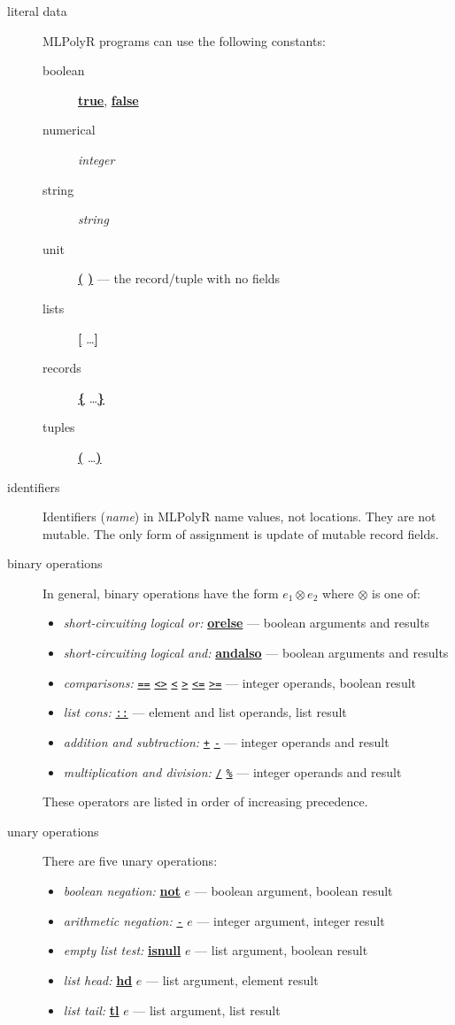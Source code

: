 \documentclass{article}
\newcommand{\nt}[1]{{\it #1}}
\newcommand{\tl}[1]{{\underline{\bf #1}}}
\newcommand{\ttl}[1]{{\underline{\tt #1}}}
\begin{document}
\begin{description}

\item[literal data]  MLPolyR programs can use the following constants:
  \begin{description}
  \item[boolean] \tl{true}, \tl{false}
  \item[numerical] \nt{integer}
  \item[string] \nt{string}
  \item[unit] \tl{(} \tl{)}   --- the record/tuple with no fields
  \item[lists] \tl{[} \ldots \tl{]}
  \item[records] \tl{\{} \ldots \tl{\}}
  \item[tuples] \tl{(} \ldots \tl{)}
  \end{description}
  
\item[identifiers] Identifiers (\nt{name}) in MLPolyR name values, not
  locations.  They are not mutable.  The only form of assignment is
  update of mutable record fields.
  
\item[binary operations] In general, binary operations have the form
  $e_1 \otimes e_2$ where $\otimes$ is one of:
  \begin{itemize}
  \item {\it short-circuiting logical or:} \tl{orelse} --- boolean arguments
    and results
  \item {\it short-circuiting logical and:} \tl{andalso} --- boolean arguments
    and results
  \item {\it comparisons:} \ttl{==} \ttl{<>} \ttl{<} \ttl{>} \ttl{<=}
                           \ttl{>=} --- integer operands, boolean result
  \item {\it list cons:} \ttl{::} --- element and list operands, list result
  \item {\it addition and subtraction:} \ttl{+} \ttl{-} --- integer
    operands and result
  \item {\it multiplication and division:} \ttl{*} \ttl{/} \ttl{\%}
        --- integer operands and result
  \end{itemize}

  \noindent These operators are listed in order of increasing precedence.

\item[unary operations] There are five unary operations:
  \begin{itemize}
  \item {\it boolean negation:} \tl{not} $e$ --- boolean argument,
    boolean result
  \item {\it arithmetic negation:} \ttl{-} $e$ --- integer argument,
    integer result
  \item {\it empty list test:} \tl{isnull} $e$ --- list argument, boolean result
  \item {\it list head:} \tl{hd} $e$ --- list argument, element result
  \item {\it list tail:} \tl{tl} $e$ --- list argument, list result
  \end{itemize}
  

\end{description}
\end{document}
